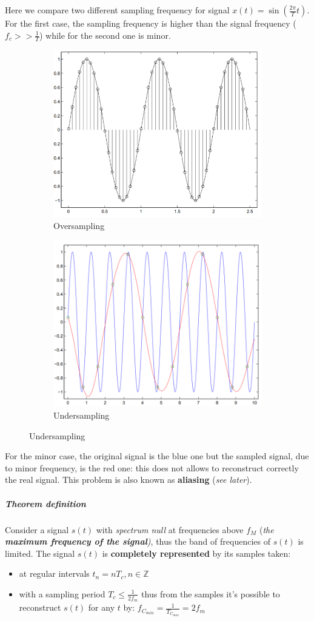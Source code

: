 \documentclass[10pt,a4paper]{report}
\theoremstyle{definition}
\begin{document}
Here we compare two different sampling frequency for signal $x(t)=\sin(\frac{2\pi}{T}t)$. For the first case, the sampling frequency is higher than the signal frequency ($f_{c} >> \frac{1}{T}$) while for the second one is minor.



\begin{figure}[h!]
	\centering
	\begin{subfigure}{.5\textwidth}
		\centering
		\includegraphics[width=.6\linewidth]{images/Pasted image 20230526142720.png}
		\caption{Oversampling}
		\label{sample-eg-1}
	\end{subfigure}%
	\begin{subfigure}{.5\textwidth}
		\centering
		\includegraphics[width=.6\linewidth]{images/Pasted image 20230526142733.png}
		\caption{Undersampling}
		\label{sample-eg-1-reconstruct}
	\end{subfigure}
	
	
\end{figure}


For the minor case, the original signal is the blue one but the sampled signal, due to minor frequency, is the red one: this does not allows to reconstruct correctly the real signal. This problem is also known as \textbf{aliasing} (\textit{see later}).
\subparagraph{Theorem definition}\label{sec:theorem-definition}
Consider a signal $s(t)$ with \textit{spectrum null} at frequencies above $f_{M}$ (\textit{the \textbf{maximum frequency of the signal})}, thus the band of frequencies of $s(t)$ is limited.
The signal $s(t)$ is \textbf{completely represented} by its samples taken:
\begin{itemize}
	\item 
	at regular intervals $t_{n} = nT_{c}, n \in \mathbb{Z}$
	\item 
	with a sampling period $T_{c} \leq \frac{1}{2f_{m}}$
	thus from the samples it's possible to reconstruct $s(t)$ for any $t$ by:
	$f_{C_{min}} = \frac{1}{T_{C_{max}}} = 2f_{m}$
\end{itemize}
\end{document}
